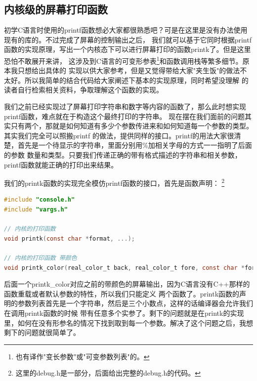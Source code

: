 \subsection {内核级的屏幕打印函数}

\par 初学C语言时使用的printf函数想必大家都很熟悉吧？可是在这里是没有办法使用现有的库的。不过完成了屏幕的控制输出之后，\allowbreak
我们就可以基于它同时根据printf函数的实现原理，写出一个内核态下可以进行屏幕打印的函数printk了。但是这里恐怕不敢展开来讲，\allowbreak
这涉及到C语言的可变形参表\footnote{也有译作"变长参数"或"可变参数列表"的。}和函数调用栈等繁多细节。原本我只想给出具体的\allowbreak
实现以供大家参考，但是又觉得带给大家"夹生饭"的做法不太好。所以我简单的结合代码给大家阐述下基本的实现原理，同时希望没理解\allowbreak
的读者自行检索相关资料，争取理解这个函数的实现。

\par 我们之前已经实现过了屏幕打印字符串和数字等内容的函数了，那么此时想实现printf函数，难点就在于构造这个最终打印的字符串。\allowbreak
现在摆在我们面前的问题其实只有两个，那就是如何知道有多少个参数传进来和如何知道每一个参数的类型。其实我们完全可以照搬printf\allowbreak
的做法，提供同样的接口。printf的用法大家很清楚，首先是一个待显示的字符串，里面分别用\%加相关字母的方式一一指明了后面的参数\allowbreak
数量和类型。只要我们传递正确的带有格式描述的字符串和相关参数，printf函数就能正确的打印出来结果。

\par 我们的printk函数的实现完全模仿printf函数的接口，首先是函数声明：\allowbreak
\footnote{这里的debug.h是一部分，后面给出完整的debug.h的代码。}

\begin{lstlisting}[language = C, label = include/debug.h, caption = include/debug.h]
#include "console.h"
#include "vargs.h"

// 内核的打印函数
void printk(const char *format, ...);

// 内核的打印函数 带颜色
void printk_color(real_color_t back, real_color_t fore, const char *format, ...);
\end{lstlisting}

\par 后面一个printk\_color对应之前的带颜色的屏幕输出，因为C语言没有C++那样的函数重载或者默认参数的特性，所以我们只能定义\allowbreak
两个函数了。printk函数的声明的参数列表首先是一个字符串，然后是三个小数点，这样的话编译器会允许我们在调用printk函数的时候\allowbreak
带有任意多个实参了。剩下的问题就是在printk的实现里，如何在没有形参名的情况下找到取到每一个参数。解决了这个问题之后，我想\allowbreak
剩下的问题就很简单了。

